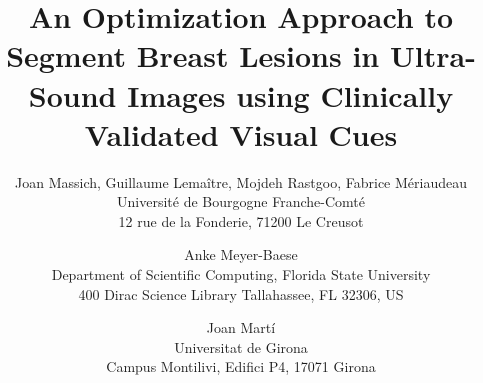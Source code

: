 \title{An Optimization Approach to Segment Breast Lesions in Ultra-Sound Images using Clinically Validated Visual Cues}

\author{Joan Massich, Guillaume Lema\^itre, Mojdeh Rastgoo, Fabrice M\'eriaudeau\\                                  
Universit\'e de Bourgogne Franche-Comt\'e\\                                                                                            
12 rue de la Fonderie, 71200 Le Creusot\\
\and
Anke Meyer-Baese\\
Department of Scientific Computing, Florida State University\\
400 Dirac Science Library Tallahassee, FL 32306, US\\
\and
Joan Mart\'i\\
Universitat de Girona\\
Campus Montilivi, Edifici P4, 17071 Girona\\}